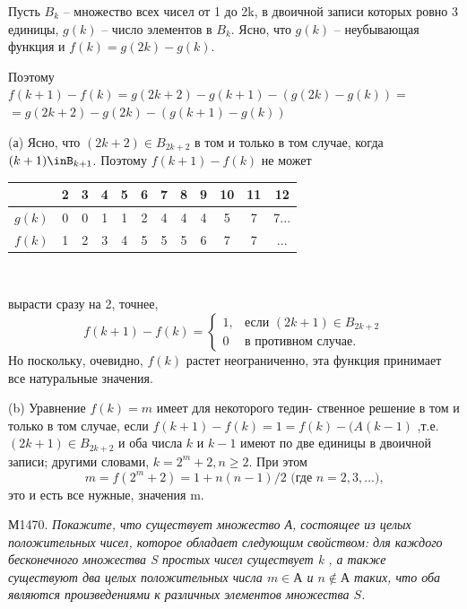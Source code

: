 \documentclass{article}
\begin{document}
\begin{multicols}{2}
Пусть $B_k$ -- множество всех чисел от 1 до 2k, в двоичной записи которых ровно 3 единицы, $g(k)$ -- число элементов в $B_k$. Ясно, что $g(k)$ -- неубывающая функция и $f(k) = g(2k) - g(k)$.\par
Поэтому\\
$f(k+1) - f(k) = g(2k+2) - g(k+1) - (g(2k) - g(k)) = $\\
$ = g(2k+2) - g(2k) - (g(k+1)-g(k))$\\
\par
(а) Ясно, что $(2k+2) \in B_{2k+2}$ в том и только в том случае, когда $(k+1)\inB_{k+1}$. Поэтому $f(k+1) - f(k)$ не может
\vfill\null
\columnbreak
\begin{tabular}{|c|c|c|c|c|c|c|c|c|c|c|c|}
    \hline
     & 2 & 3 & 4 & 5 & 6 & 7 & 8 & 9 & 10 & 11 & 12 \\
    \hline
    $g(k)$ & 0 & 0 & 1 & 1 & 2 & 4 & 4 & 4 & 5 & 7 & 7...\\
    \hline
    $f(k)$ & 1 & 2 & 3 & 4 & 5 & 5 & 5 & 6 & 7 & 7 & ...\\
    \hline
\end{tabular}\\\par
вырасти сразу на 2, точнее,
\begin{equation*}
f(k+1) - f(k) = 
 \begin{cases}
   1, &\text{если $(2k+1) \in B_{2k+2}$}
   \\
   0 &\text{в противном случае.}
 \end{cases}
\end{equation*}
Но поскольку, очевидно, $f(k)$ растет неограниченно, эта функция принимает все натуральные значения.\par
(b) Уравнение $f(k)=m$ имеет для некоторого тедин- ственное решение в том и только в том случае, если $f(k+1) - f(k)=1=f(k) - (A(k-1)$ ,т.е. $(2k+1) \in B_{2k+2}$ и оба числа $k$ и $k - 1$ имеют по две единицы в двоичной записи; другими словами, $k = 2^m + 2, n \ge 2$. При этом
$$m=f(2^m +2) = 1+n(n-1)/2 \text{ (где $n=2, 3, … $),}$$
это и есть все нужные, значения m.\\\par
М1470. \textit{Покажите, что существует множество А, состоящее из целых положительных чисел, которое обладает следующим свойством: для каждого бесконечного множества S простых чисел существует k , а также существуют два целых положительных числа $m \in \text{А}$ и $n \notin \text{А}$ таких, что оба являются произведениями к различных элементов множества $S$.}\\\par

\end{multicols}
\end{document}
